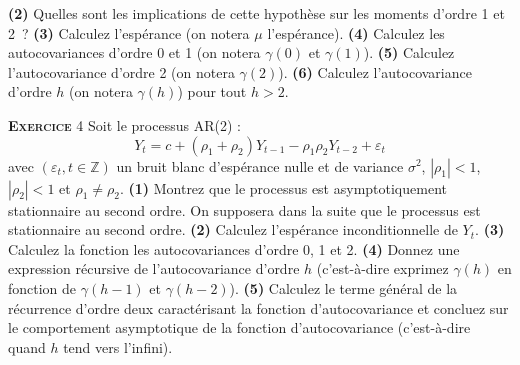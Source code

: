 \documentclass[10pt,a4paper,notitlepage,twocolumn]{article}
\newcommand{\exercice}[1]{\textsc{\textbf{Exercice}} #1}
\newcommand{\question}[1]{\textbf{(#1)}}
\begin{document}
\question{2} Quelles sont les implications de cette hypothèse sur les
moments d'ordre 1 et 2 ? \question{3} Calculez l'espérance (on notera
$\mu$ l'espérance). \question{4} Calculez les autocovariances d'ordre
0 et 1 (on notera $\gamma(0)$ et $\gamma(1)$). \question{5} Calculez
l'autocovariance d'ordre 2 (on notera $\gamma(2)$). \question{6}
Calculez l'autocovariance d'ordre $h$ (on notera $\gamma(h)$) pour tout
$h>2$.

\bigskip
\bigskip

\exercice{4} Soit le processus AR(2) :
\[
Y_t = c + (\rho_1+\rho_2)Y_{t-1} - \rho_1\rho_2 Y_{t-2} + \varepsilon_t
\]
avec $(\varepsilon_t, t\in\mathbb Z)$ un bruit blanc d'espérance nulle et de
variance $\sigma^2$, $|\rho_1|<1$, $|\rho_2|<1$ et $\rho_1\neq\rho_2$.
\question{1} Montrez que le processus est asymptotiquement stationnaire au
second ordre. On supposera dans la suite que le processus est stationnaire au
second ordre. \question{2} Calculez l'espérance inconditionnelle de $Y_t$.
\question{3} Calculez la fonction les autocovariances d'ordre 0, 1 et 2.
\question{4} Donnez une expression récursive de l'autocovariance d'ordre $h$
(c'est-à-dire exprimez $\gamma(h)$ en fonction de $\gamma(h-1)$ et
$\gamma(h-2)$). \question{5} Calculez le terme général de la récurrence d'ordre
deux caractérisant la fonction d'autocovariance et concluez sur le comportement
asymptotique de la fonction d'autocovariance (c'est-à-dire quand $h$ tend vers
l'infini).
\end{document}
